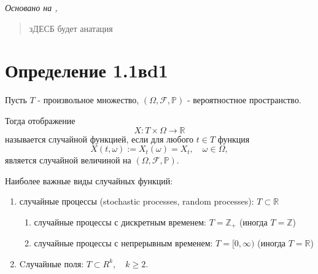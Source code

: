 \textit{Основано на \cite{adeshereKorrelyaciyaMezhduVremennymi2021},
\cite{panovTeoriyaSluchaynyhProcessov2018}}

\begin{abstract} %
  зДЕСБ будет анатация
\end{abstract}

\section*{Определение 1.1вd1}

Пусть \( T \) - произвольное множество, \( (\Omega, \mathcal{F},
\mathbb{P}) \) - вероятностное пространство.

Тогда отображение \[ X : T \times \Omega \to \mathbb{R} \] называется
случайной функцией, если для
любого \( t \in T \) функция \[ X(t, \omega) := X_t(\omega) = X_t,
\quad \omega \in \Omega, \]  является случайной величиной на \(
(\Omega, \mathcal{F}, \mathbb{P}) \).

Наиболее важные виды случайных функций:
\begin{enumerate}
  \item случайные процессы (stochastic processes, random processes):
    \( T \subset \mathbb{R} \)
    \begin{enumerate}
      \item случайные процессы с дискретным временем: \( T =
        \mathbb{Z}_+ \) (иногда \( T = \mathbb{Z} \))
      \item случайные процессы с непрерывным временем: \( T = [0,
        \infty) \) (иногда \( T = \mathbb{R} \))
    \end{enumerate}
  \item Cлучайные поля: \( T \subset R^k, \quad k \geq 2 \).
\end{enumerate}



